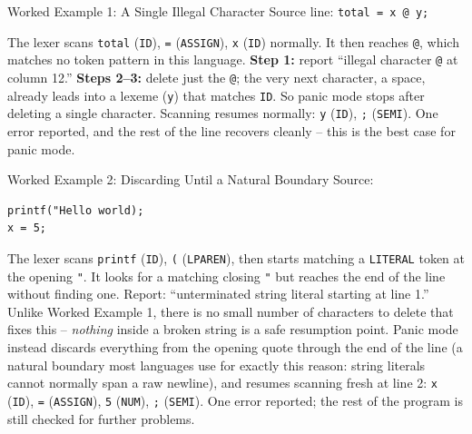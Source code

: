 \documentclass[full-course-notes.tex]{subfiles}
\begin{document}
\begin{examplebox}{Worked Example 1: A Single Illegal Character}
Source line: \quad \texttt{total = x @ y;}

The lexer scans \texttt{total} (\texttt{ID}), \texttt{=} (\texttt{ASSIGN}), \texttt{x}
(\texttt{ID}) normally. It then reaches \texttt{@}, which matches no token pattern in this
language. \textbf{Step 1:} report ``illegal character \texttt{@} at column 12.'' \textbf{Steps
2--3:} delete just the \texttt{@}; the very next character, a space, already leads into a
lexeme (\texttt{y}) that matches \texttt{ID}. So panic mode stops after deleting a single
character. Scanning resumes normally: \texttt{y} (\texttt{ID}), \texttt{;} (\texttt{SEMI}). One
error reported, and the rest of the line recovers cleanly -- this is the best case for panic
mode.
\end{examplebox}

\begin{examplebox}{Worked Example 2: Discarding Until a Natural Boundary}
Source:
\begin{verbatim}
printf("Hello world);
x = 5;
\end{verbatim}
The lexer scans \texttt{printf} (\texttt{ID}), \texttt{(} (\texttt{LPAREN}), then starts
matching a \texttt{LITERAL} token at the opening \texttt{"}. It looks for a matching closing
\texttt{"} but reaches the end of the line without finding one. Report: ``unterminated string
literal starting at line 1.'' Unlike Worked Example 1, there is no small number of characters
to delete that fixes this -- \emph{nothing} inside a broken string is a safe resumption point.
Panic mode instead discards everything from the opening quote through the end of the line (a
natural boundary most languages use for exactly this reason: string literals cannot normally
span a raw newline), and resumes scanning fresh at line 2: \texttt{x} (\texttt{ID}), \texttt{=}
(\texttt{ASSIGN}), \texttt{5} (\texttt{NUM}), \texttt{;} (\texttt{SEMI}). One error reported;
the rest of the program is still checked for further problems.
\end{examplebox}
\end{document}
